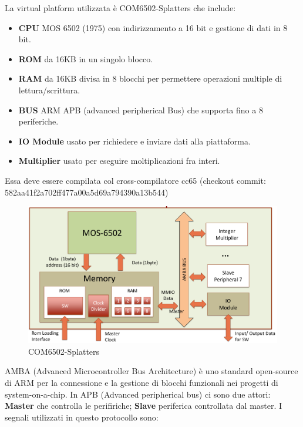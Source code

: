 \documentclass[]{IEEEtran}
\begin{document}
La virtual platform utilizzata è COM6502-Splatters che include:
\begin{itemize}
    \item \textbf{CPU} MOS 6502 (1975) con indirizzamento a 16 bit e gestione di dati in 8 bit.
    \item \textbf{ROM} da 16KB in un singolo blocco.
    \item \textbf{RAM} da 16KB divisa in 8 blocchi per permettere operazioni multiple di lettura/scrittura.
    \item \textbf{BUS} ARM APB (advanced peripherical Bus) che supporta fino a 8 periferiche.
    \item \textbf{IO Module} usato per richiedere e inviare dati alla piattaforma.
    \item \textbf{Multiplier} usato per eseguire moltiplicazioni fra interi.
\end{itemize}
Essa deve essere compilata col cross-compilatore cc65\cite{CC65} (checkout commit: 582aa41f2a702ff477a00a5d69a794390a13b544)
\begin{figure}[!htb]
    \centering
    \includegraphics[width=0.9\linewidth]{figures/splatters}
    \caption{COM6502-Splatters}
    \label{fig:splatters}
\end{figure}
AMBA (Advanced Microcontroller Bus Architecture) è uno standard open-source di ARM per la connessione e la gestione di blocchi funzionali nei progetti di system-on-a-chip. In APB (Advanced peripherical bus) ci sono due attori: \textbf{Master} che controlla le perifiriche; \textbf{Slave} periferica controllata dal master. I segnali utilizzati in questo protocollo sono:
\end{document}
